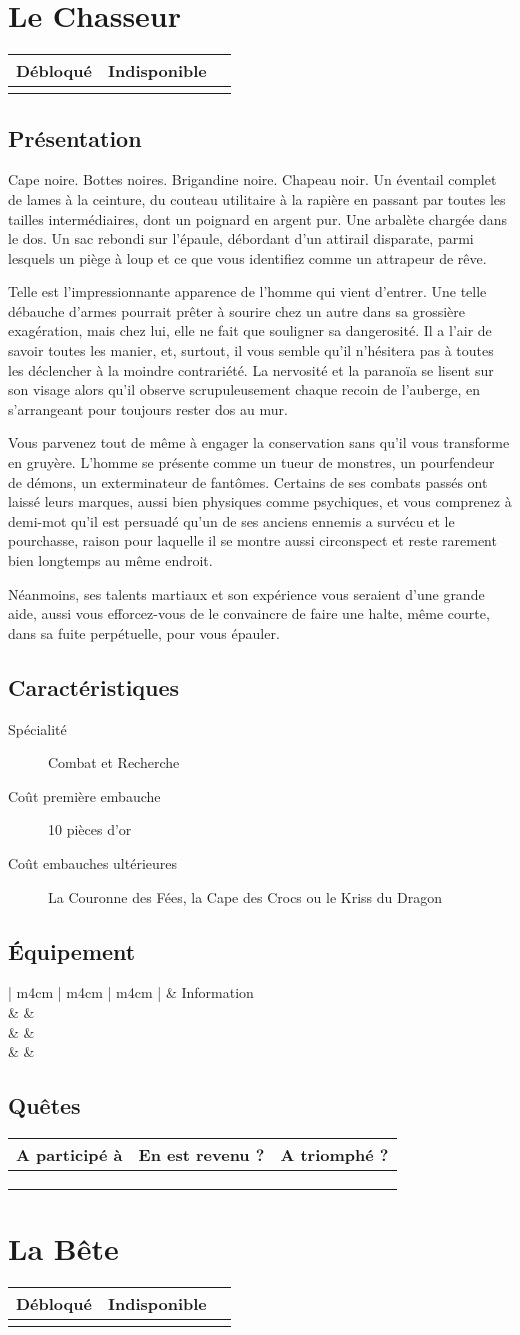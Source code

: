 \documentclass{report}
\newcommand{\hero}[5]{
    \herostats{#1}{#2}{#3}{#4}

    \fullbleed{#5}

    \herosheet
}
\newcommand{\herostats}[4]{
    \section{Présentation}

    #1

    \section{Caractéristiques}

    \begin{description}
        \item[Spécialité] #2
        \item[Coût première embauche] #3
        \item[Coût embauches ultérieures] #4
    \end{description}
}
\newcommand{\herosheet}{
    \section{Équipement}

    \begin{tabular}{ | m{4cm} | m{4cm} | m{4cm} | }
        \hline
        \multicolumn{2}{| m{8cm} |}{Équipement} & Information\\
        \hline
        \mytextfield{4cm} & \mytextfield{4cm} & \mytextfield{4cm}\\
        \hline
        \mytextfield{4cm} & \mytextfield{4cm} & \mytextfield{4cm}\\
        \hline
        \mytextfield{4cm} & \mytextfield{4cm} & \mytextfield{4cm}\\
        \hline
    \end{tabular}

    \section{Quêtes}

    \begin{tabular}{ | m{7cm} | m{2.5cm} | m{2.5cm} |}
        \hline
        A participé à & En est revenu ? & A triomphé ?\\
        \hline
        \mytextfield{7cm} & \mycheckbox & \mycheckbox \\ 
        \hline
        \mytextfield{7cm} & \mycheckbox & \mycheckbox \\ 
        \hline
        \mytextfield{7cm} & \mycheckbox & \mycheckbox \\ 
        \hline
    \end{tabular}
}
\newcommand{\lockedhero}{
\begin{tabular}{ | m{4cm} | m{4cm} | m{4cm} | }
    \hline
    Débloqué & Indisponible\\
    \hline
    \mycheckbox & \mycheckbox \\
    \hline
\end{tabular}
}
\begin{document}
\chapter{Le Chasseur}

\lockedhero

\hero{
Cape noire. Bottes noires. Brigandine noire. Chapeau noir. Un éventail complet de lames à la ceinture, du couteau utilitaire à la rapière en passant par toutes les tailles intermédiaires, dont un poignard en argent pur. Une arbalète chargée dans le dos. Un sac rebondi sur l'épaule, débordant d'un attirail disparate, parmi lesquels un piège à loup et ce que vous identifiez comme un attrapeur de rêve.

Telle est l'impressionnante apparence de l'homme qui vient d'entrer. Une telle débauche d'armes pourrait prêter à sourire chez un autre dans sa grossière exagération, mais chez lui, elle ne fait que souligner sa dangerosité. Il a l'air de savoir toutes les manier, et, surtout, il vous semble qu'il n'hésitera pas à toutes les déclencher à la moindre contrariété. La nervosité et la paranoïa se lisent sur son visage alors qu'il observe scrupuleusement chaque recoin de l'auberge, en s'arrangeant pour toujours rester dos au mur.

Vous parvenez tout de même à engager la conservation sans qu'il vous transforme en gruyère. L'homme se présente comme un tueur de monstres, un pourfendeur de démons, un exterminateur de fantômes. Certains de ses combats passés ont laissé leurs marques, aussi bien physiques comme psychiques, et vous comprenez à demi-mot qu'il est persuadé qu'un de ses anciens ennemis a survécu et le pourchasse, raison pour laquelle il se montre aussi circonspect et reste rarement bien longtemps au même endroit.

Néanmoins, ses talents martiaux et son expérience vous seraient d'une grande aide, aussi vous efforcez-vous de le convaincre de faire une halte, même courte, dans sa fuite perpétuelle, pour vous épauler.
}{
Combat et Recherche
}{
10 pièces d'or
}{
La Couronne des Fées, la Cape des Crocs ou le Kriss du Dragon
}{images/hunter.jpg}

\chapter{La Bête}

\lockedhero
\end{document}
